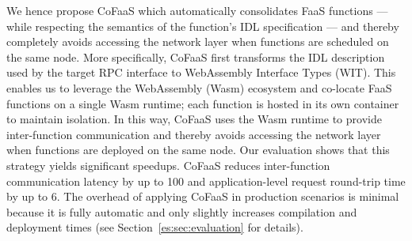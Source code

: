 We hence propose CoFaaS which automatically consolidates FaaS functions --- while respecting the semantics of the function's IDL specification --- and thereby completely avoids accessing the network layer when functions are scheduled on the same node.
More specifically, CoFaaS first transforms the IDL description used by the target RPC interface to WebAssembly Interface Types (WIT). This enables us to leverage the WebAssembly (Wasm) ecosystem and co-locate FaaS functions on a single Wasm runtime; each function is hosted in its own container to maintain isolation. %
In this way, CoFaaS uses the Wasm runtime to provide inter-function communication and thereby avoids accessing the network layer when functions are deployed on the same node. Our evaluation shows that this strategy yields significant speedups. CoFaaS reduces inter-function communication latency by up to 100\texttimes{} and application-level request round-trip time by up to 6\texttimes{}. The overhead of applying CoFaaS in production scenarios is minimal because it is fully automatic and only slightly increases compilation and deployment times (see Section~\ref{es:sec:evaluation} for details).



